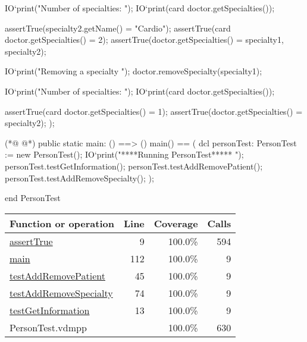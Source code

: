 \begin{vdmpp}[breaklines=true]
   IO`print("\n Number of specialties: ");
   IO`print(card doctor.getSpecialties());
   
   assertTrue(specialty2.getName() = "Cardio");
   assertTrue(card doctor.getSpecialties() = 2);
   assertTrue(doctor.getSpecialties() = {specialty1, specialty2});
   
   IO`print("\n Removing a specialty \n");
   doctor.removeSpecialty(specialty1);
   
   IO`print("\n Number of specialties: ");
   IO`print(card doctor.getSpecialties());
   
   assertTrue(card doctor.getSpecialties() = 1);
   assertTrue(doctor.getSpecialties() = {specialty2});
  );
  
(*@
\label{main:112}
@*)
 public static main: () ==> ()
   main() == (
    dcl personTest: PersonTest := new PersonTest();
    IO`print("\n *****Running PersonTest***** \n");
    personTest.testGetInformation();
    personTest.testAddRemovePatient();
    personTest.testAddRemoveSpecialty();
   );
  
end PersonTest
\end{vdmpp}
\bigskip
\begin{longtable}{|l|r|r|r|}
\hline
Function or operation & Line & Coverage & Calls \\
\hline
\hline
\hyperref[assertTrue:9]{assertTrue} & 9&100.0\% & 594 \\
\hline
\hyperref[main:112]{main} & 112&100.0\% & 9 \\
\hline
\hyperref[testAddRemovePatient:45]{testAddRemovePatient} & 45&100.0\% & 9 \\
\hline
\hyperref[testAddRemoveSpecialty:74]{testAddRemoveSpecialty} & 74&100.0\% & 9 \\
\hline
\hyperref[testGetInformation:13]{testGetInformation} & 13&100.0\% & 9 \\
\hline
\hline
PersonTest.vdmpp & & 100.0\% & 630 \\
\hline
\end{longtable}

